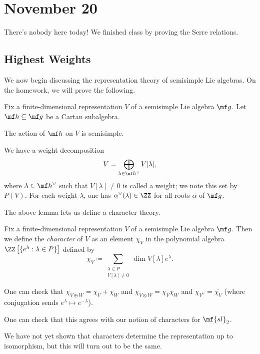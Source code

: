 \documentclass[../notes.tex]{subfiles}
\begin{document}
\section{November 20}
There's nobody here today! We finished class by proving the Serre relations.

\subsection{Highest Weights}
We now begin discussing the representation theory of semisimple Lie algebras. On the homework, we will prove the following.
\begin{lemma} 
	Fix a finite-dimensional representation $V$ of a semisimple Lie algebra $\mf g$. Let $\mf h\subseteq\mf g$ be a Cartan subalgebra.
	\begin{listalph}
		\item The action of $\mf h$ on $V$ is semisimple.
		\item We have a weight decomposition
		\[V=\bigoplus_{\lambda\in\mf h^\lor}V[\lambda],\]
		where $\lambda\in\mf h^\lor$ such that $V[\lambda]\ne0$ is called a weight; we note this set by $P(V)$. For each weight $\lambda$, one has $\alpha^\lor(\lambda)\in\ZZ$ for all roots $\alpha$ of $\mf g$.
	\end{listalph}
\end{lemma}
The above lemma lets us define a character theory.
\begin{definition}[character]
	Fix a finite-dimensional representation $V$ of a semisimple Lie algebra $\mf g$. Then we define the \textit{character} of $V$ as an element $\chi_V$ in the polynomial algebra $\ZZ\left[\{e^\lambda:\lambda\in P\}\right]$ defined by
	\[\chi_V\coloneqq\sum_{\substack{\lambda\in P\\V[\lambda]\ne0}}\dim V[\lambda]e^\lambda.\]
\end{definition}
\begin{remark}
	One can check that $\chi_{V\oplus W}=\chi_V+\chi_W$ and $\chi_{V\otimes W}=\chi_V\chi_W$ and $\chi_{V^\lor}=\overline{\chi_V}$ (where conjugation sends $e^\lambda\mapsto e^{-\lambda}$).
\end{remark}
\begin{remark}
	One can check that this agrees with our notion of characters for $\mf{sl}_2$.
\end{remark}
\begin{remark}
	We have not yet shown that characters determine the representation up to isomorphism, but this will turn out to be the same.
\end{remark}
\end{document}
